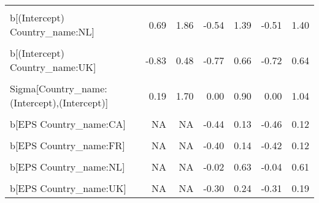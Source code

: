 \begin{table}
\begin{tabular}[t]{lrrrrrr}
\cellcolor{gray!10}{b[(Intercept) Country\_name:IL]} & \cellcolor{gray!10}{-1.56} & \cellcolor{gray!10}{1.08} & \cellcolor{gray!10}{-0.95} & \cellcolor{gray!10}{0.71} & \cellcolor{gray!10}{-0.99} & \cellcolor{gray!10}{0.70}\\
b[(Intercept) Country\_name:NL] & 0.69 & 1.86 & -0.54 & 1.39 & -0.51 & 1.40\\
\cellcolor{gray!10}{b[(Intercept) Country\_name:SE]} & \cellcolor{gray!10}{-1.08} & \cellcolor{gray!10}{0.32} & \cellcolor{gray!10}{-0.86} & \cellcolor{gray!10}{0.62} & \cellcolor{gray!10}{-0.86} & \cellcolor{gray!10}{0.63}\\
b[(Intercept) Country\_name:UK] & -0.83 & 0.48 & -0.77 & 0.66 & -0.72 & 0.64\\
\cellcolor{gray!10}{b[(Intercept) Country\_name:US]} & \cellcolor{gray!10}{-0.80} & \cellcolor{gray!10}{0.48} & \cellcolor{gray!10}{-0.76} & \cellcolor{gray!10}{0.61} & \cellcolor{gray!10}{-0.68} & \cellcolor{gray!10}{0.59}\\
Sigma[Country\_name:(Intercept),(Intercept)] & 0.19 & 1.70 & 0.00 & 0.90 & 0.00 & 1.04\\
\cellcolor{gray!10}{b[EPS Country\_name:BE]} & \cellcolor{gray!10}{NA} & \cellcolor{gray!10}{NA} & \cellcolor{gray!10}{-0.12} & \cellcolor{gray!10}{0.47} & \cellcolor{gray!10}{-0.10} & \cellcolor{gray!10}{0.46}\\
b[EPS Country\_name:CA] & NA & NA & -0.44 & 0.13 & -0.46 & 0.12\\
\cellcolor{gray!10}{b[EPS Country\_name:CH]} & \cellcolor{gray!10}{NA} & \cellcolor{gray!10}{NA} & \cellcolor{gray!10}{-0.25} & \cellcolor{gray!10}{0.25} & \cellcolor{gray!10}{-0.27} & \cellcolor{gray!10}{0.24}\\
b[EPS Country\_name:FR] & NA & NA & -0.40 & 0.14 & -0.42 & 0.12\\
\cellcolor{gray!10}{b[EPS Country\_name:IL]} & \cellcolor{gray!10}{NA} & \cellcolor{gray!10}{NA} & \cellcolor{gray!10}{-0.51} & \cellcolor{gray!10}{0.50} & \cellcolor{gray!10}{-0.50} & \cellcolor{gray!10}{0.48}\\
b[EPS Country\_name:NL] & NA & NA & -0.02 & 0.63 & -0.04 & 0.61\\
\cellcolor{gray!10}{b[EPS Country\_name:SE]} & \cellcolor{gray!10}{NA} & \cellcolor{gray!10}{NA} & \cellcolor{gray!10}{-0.37} & \cellcolor{gray!10}{0.18} & \cellcolor{gray!10}{-0.37} & \cellcolor{gray!10}{0.16}\\
b[EPS Country\_name:UK] & NA & NA & -0.30 & 0.24 & -0.31 & 0.19\\

\end{tabular}
\end{table}
